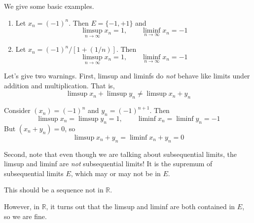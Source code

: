   \begin{example}
    We give some basic examples. 
    \begin{enumerate}
      \item Let $x_n = (-1)^n$. Then $E = \{-1, +1\}$ and 
      \begin{equation}
        \limsup_{n \rightarrow \infty} x_n = 1, \qquad \liminf_{n \rightarrow \infty} x_n = -1 
      \end{equation}

      \item Let $x_n = (-1)^n / [1 + (1/n)]$. Then 
      \begin{equation}
        \limsup_{n \rightarrow \infty} x_n = 1, \qquad \liminf_{n \rightarrow \infty} x_n = -1
      \end{equation}
    \end{enumerate}
  \end{example}

  Let's give two warnings. First, limsup and liminfs do \textit{not} behave like limits under addition and multiplication. That is, 
  \begin{equation}
    \limsup x_n + \limsup y_n \neq \limsup x_n + y_n 
  \end{equation}

  \begin{example}
    Consider $(x_n) = (-1)^n$ and $y_n = (-1)^{n+1}$. Then 
    \begin{equation}
      \limsup x_n = \limsup y_n = 1, \qquad \liminf x_n = \liminf y_n = -1
    \end{equation}
    But $(x_n + y_n) = 0$, so 
    \begin{equation}
      \limsup x_n + y_n = \liminf x_n + y_n = 0 
    \end{equation}
  \end{example}

  Second, note that even though we are talking about subsequential limits, the limsup and liminf are \textit{not} subsequential limits! It is the supremum of subsequential limits $E$, which may or may not be in $E$. 

  \begin{example}
    This should be a sequence not in $\mathbb{R}$. 
  \end{example}

  However, in $\mathbb{R}$, it turns out that the limsup and liminf are both contained in $E$, so we are fine. 

